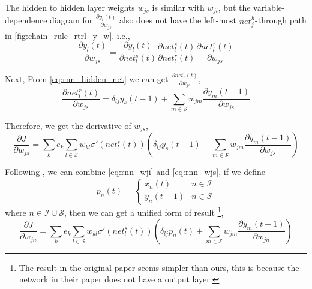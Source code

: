 \documentclass[12pt]{article}
\numberwithin{equation}{section}
\begin{document}
The hidden to hidden layer weights $w_{js}$ is similar with $w_{ji}$, but the variable-dependence diagram for $\frac{\partial y_l(t)}{\partial w_{js}}$ 
also does not have the left-most $net^h_j$-through path in \autoref{fig:chain_rule_rtrl_y_w}. i.e.,
\begin{equation}
    \frac{\partial y_l(t)}{\partial w_{js}} =  \frac{\partial y_l(t)}{\partial net^s_l(t)} \frac{\partial net^s_l(t)}{\partial net^r_l(t)} 
                                                               \frac{\partial net^r_l(t)}{\partial w_{js}}
\end{equation}

Next, From \eqref{eq:rnn_hidden_net} we can get $\frac{\partial net^r_l(t)}{\partial w_{js}}$,
\begin{equation}
    \frac{\partial net^r_l(t)}{\partial w_{js}} = \delta_{lj} y_s(t-1) +
                                                               \sum_{m \in \mathcal{S}} {w_{jm}\frac{\partial y_m(t-1)}{\partial w_{js}}}
\end{equation}

Therefore, we get the derivative of $w_{js}$,
\begin{equation} \label{eq:rnn_wjs}
    \frac{\partial J}{\partial w_{js}} = \sum_k{e_k \sum_{l \in \mathcal{S}} { w_{kl} \sigma'(net^s_l(t))(\delta_{lj}y_s(t-1) 
                                                      + \sum_{m \in \mathcal{S}} w_{jm} \frac{\partial y_m(t-1)}{\partial w_{js}})}}
\end{equation}

Following \cite{williams1989learning}, we can combine \eqref{eq:rnn_wji} and \eqref{eq:rnn_wjs}, if we define
$$
    p_n(t) = \left\{\begin{array}{ll}
                                    x_n(t) &  n \in \mathcal{I}  \\
                                    y_n(t-1) &  n \in \mathcal{S} 
                          \end{array} \right.
$$
where $n \in \mathcal{I} \cup \mathcal{S}$, then we can get a unified form of result
\footnote{The result in the original paper \cite{williams1989learning} seems simpler than ours, 
this is because the network in their paper does not have a output layer.},
\begin{equation}
    \frac{\partial J}{\partial w_{jn}} = \sum_k{e_k \sum_{l \in \mathcal{S}} { w_{kl} \sigma'(net^s_l(t))(\delta_{lj}p_n(t) 
                                                      + \sum_{m \in \mathcal{S}} w_{jm} \frac{\partial y_m(t-1)}{\partial w_{jn}})}}
\end{equation}
\end{document}
